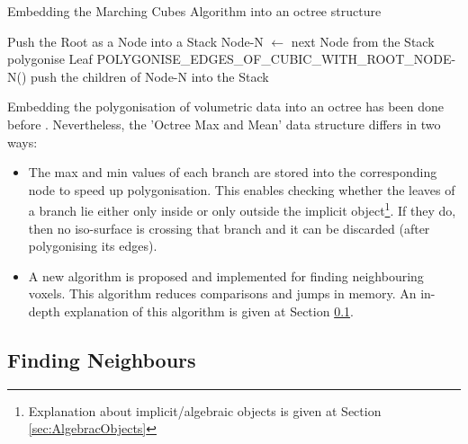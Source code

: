 \documentclass{subfiles}
\begin{document}
\begin{algorithm}[!htbp]
	\caption{Embedding the Marching Cubes Algorithm into an octree structure}
	\label{alg:MCOctree}
	\centering
	\begin{algorithmic}[1]
		\State Push the Root as a Node into a Stack
		\State Node-N   $\gets$  next Node from the Stack 
		\State polygonise Leaf
		\State	POLYGONISE\_EDGES\_OF\_CUBIC\_WITH\_ROOT\_NODE-N()	
		\Else
		\State push the children of Node-N into the Stack
		\EndIf
		\EndWhile
	\end{algorithmic}
\end{algorithm}




\par Embedding the polygonisation of volumetric data into an octree has been done before \cite{Wilhelms1990}. Nevertheless, the 'Octree Max and Mean' data structure differs in two ways:
\begin{itemize}
	\item The max and min values of each branch are stored into the corresponding node to speed up polygonisation. This enables checking whether the leaves of a branch lie either only inside or only outside the implicit object{\footnote{Explanation about implicit/algebraic objects is given at Section \ref{sec:AlgebracObjects}}}. If they do, then no iso-surface is crossing that branch and it can be discarded (after polygonising its edges).
    \item A new algorithm is proposed and implemented for finding neighbouring voxels. This algorithm reduces comparisons and jumps in memory. An in-depth explanation of this algorithm is given at Section \ref{sec:NeighboursFinding}.
\end{itemize}





\subsection{Finding Neighbours}\label{sec:NeighboursFinding}
\end{document}
